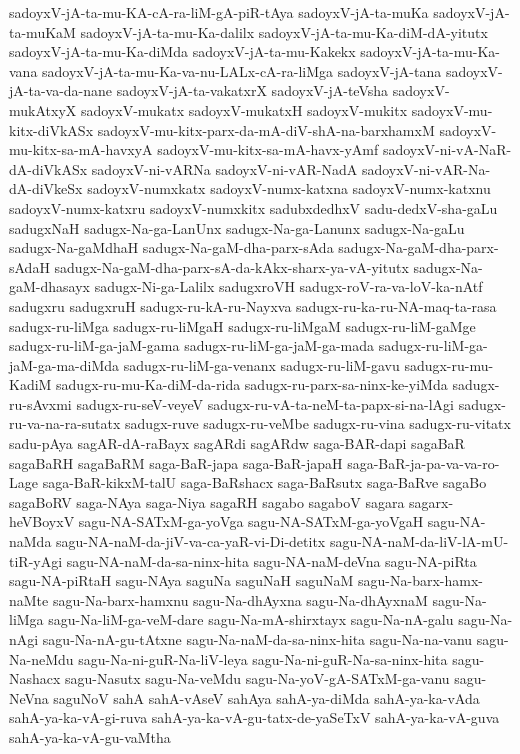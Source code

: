 {sadoyxV-jA-ta-mu-KA-cA-ra-liM-gA-piR-tAya
sadoyxV-jA-ta-muKa
sadoyxV-jA-ta-muKaM
sadoyxV-jA-ta-mu-Ka-dalilx
sadoyxV-jA-ta-mu-Ka-diM-dA-yitutx
sadoyxV-jA-ta-mu-Ka-diMda
sadoyxV-jA-ta-mu-Kakekx
sadoyxV-jA-ta-mu-Ka-vana
sadoyxV-jA-ta-mu-Ka-va-nu-LALx-cA-ra-liMga
sadoyxV-jA-tana
sadoyxV-jA-ta-va-da-nane
sadoyxV-jA-ta-vakatxrX
sadoyxV-jA-teVsha
sadoyxV-mukAtxyX
sadoyxV-mukatx
sadoyxV-mukatxH
sadoyxV-mukitx
sadoyxV-mu-kitx-diVkASx
sadoyxV-mu-kitx-parx-da-mA-diV-shA-na-barxhamxM
sadoyxV-mu-kitx-sa-mA-havxyA
sadoyxV-mu-kitx-sa-mA-havx-yAmf
sadoyxV-ni-vA-NaR-dA-diVkASx
sadoyxV-ni-vARNa
sadoyxV-ni-vAR-NadA
sadoyxV-ni-vAR-Na-dA-diVkeSx
sadoyxV-numxkatx
sadoyxV-numx-katxna
sadoyxV-numx-katxnu
sadoyxV-numx-katxru
sadoyxV-numxkitx
sadubxdedhxV
sadu-dedxV-sha-gaLu
sadugxNaH
sadugx-Na-ga-LanUnx
sadugx-Na-ga-Lanunx
sadugx-Na-gaLu
sadugx-Na-gaMdhaH
sadugx-Na-gaM-dha-parx-sAda
sadugx-Na-gaM-dha-parx-sAdaH
sadugx-Na-gaM-dha-parx-sA-da-kAkx-sharx-ya-vA-yitutx
sadugx-Na-gaM-dhasayx
sadugx-Ni-ga-Lalilx
sadugxroVH
sadugx-roV-ra-va-loV-ka-nAtf
sadugxru
sadugxruH
sadugx-ru-kA-ru-Nayxva
sadugx-ru-ka-ru-NA-maq-ta-rasa
sadugx-ru-liMga
sadugx-ru-liMgaH
sadugx-ru-liMgaM
sadugx-ru-liM-gaMge
sadugx-ru-liM-ga-jaM-gama
sadugx-ru-liM-ga-jaM-ga-mada
sadugx-ru-liM-ga-jaM-ga-ma-diMda
sadugx-ru-liM-ga-venanx
sadugx-ru-liM-gavu
sadugx-ru-mu-KadiM
sadugx-ru-mu-Ka-diM-da-rida
sadugx-ru-parx-sa-ninx-ke-yiMda
sadugx-ru-sAvxmi
sadugx-ru-seV-veyeV
sadugx-ru-vA-ta-neM-ta-papx-si-na-lAgi
sadugx-ru-va-na-ra-sutatx
sadugx-ruve
sadugx-ru-veMbe
sadugx-ru-vina
sadugx-ru-vitatx
sadu-pAya
sagAR-dA-raBayx
sagARdi
sagARdw
saga-BAR-dapi
sagaBaR
sagaBaRH
sagaBaRM
saga-BaR-japa
saga-BaR-japaH
saga-BaR-ja-pa-va-va-ro-Lage
saga-BaR-kikxM-talU
saga-BaRshacx
saga-BaRsutx
saga-BaRve
sagaBo
sagaBoRV
saga-NAya
saga-Niya
sagaRH
sagabo
sagaboV
sagara
sagarx-heVBoyxV
sagu-NA-SATxM-ga-yoVga
sagu-NA-SATxM-ga-yoVgaH
sagu-NA-naMda
sagu-NA-naM-da-jiV-va-ca-yaR-vi-Di-detitx
sagu-NA-naM-da-liV-lA-mU-tiR-yAgi
sagu-NA-naM-da-sa-ninx-hita
sagu-NA-naM-deVna
sagu-NA-piRta
sagu-NA-piRtaH
sagu-NAya
saguNa
saguNaH
saguNaM
sagu-Na-barx-hamx-naMte
sagu-Na-barx-hamxnu
sagu-Na-dhAyxna
sagu-Na-dhAyxnaM
sagu-Na-liMga
sagu-Na-liM-ga-veM-dare
sagu-Na-mA-shirxtayx
sagu-Na-nA-galu
sagu-Na-nAgi
sagu-Na-nA-gu-tAtxne
sagu-Na-naM-da-sa-ninx-hita
sagu-Na-na-vanu
sagu-Na-neMdu
sagu-Na-ni-guR-Na-liV-leya
sagu-Na-ni-guR-Na-sa-ninx-hita
sagu-Nashacx
sagu-Nasutx
sagu-Na-veMdu
sagu-Na-yoV-gA-SATxM-ga-vanu
sagu-NeVna
saguNoV
sahA
sahA-vAseV
sahAya
sahA-ya-diMda
sahA-ya-ka-vAda
sahA-ya-ka-vA-gi-ruva
sahA-ya-ka-vA-gu-tatx-de-yaSeTxV
sahA-ya-ka-vA-guva
sahA-ya-ka-vA-gu-vaMtha
}
